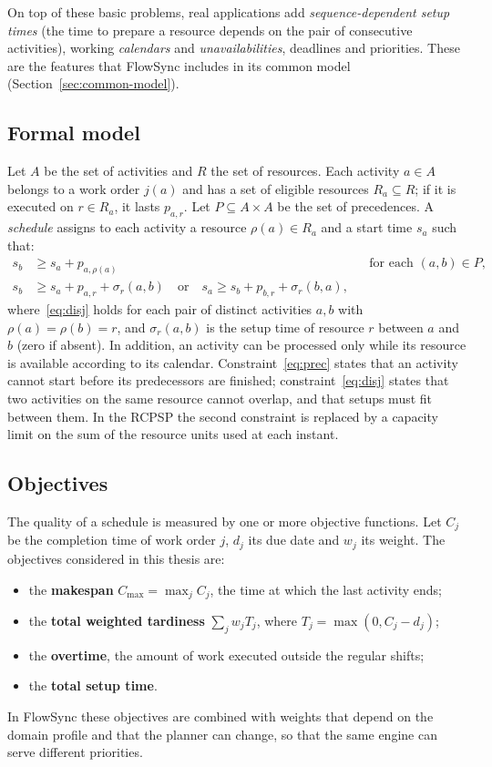 On top of these basic problems, real applications add \emph{sequence-dependent setup times} (the
time to prepare a resource depends on the pair of consecutive activities), working
\emph{calendars} and \emph{unavailabilities}, deadlines and priorities. These are the features
that FlowSync includes in its common model (Section~\ref{sec:common-model}).

\subsection{Formal model}

Let $A$ be the set of activities and $R$ the set of resources. Each activity $a \in A$ belongs to
a work order $j(a)$ and has a set of eligible resources $R_a \subseteq R$; if it is executed on
$r \in R_a$, it lasts $p_{a,r}$. Let $P \subseteq A \times A$ be the set of precedences. A
\emph{schedule} assigns to each activity a resource $\rho(a) \in R_a$ and a start time $s_a$ such
that:
\begin{align}
  s_b &\ge s_a + p_{a,\rho(a)} && \text{for each } (a,b) \in P, \label{eq:prec}\\
  s_b &\ge s_a + p_{a,r} + \sigma_r(a,b) \quad\text{or}\quad
  s_a \ge s_b + p_{b,r} + \sigma_r(b,a), \label{eq:disj}
\end{align}
where~\eqref{eq:disj} holds for each pair of distinct activities $a, b$ with $\rho(a) = \rho(b) = r$,
and $\sigma_r(a,b)$ is the setup time of resource $r$ between $a$ and $b$ (zero if absent).
In addition, an activity can be processed only while its resource is available according to its
calendar. Constraint~\eqref{eq:prec} states that an activity cannot start before its
predecessors are finished; constraint~\eqref{eq:disj} states that two activities on the same
resource cannot overlap, and that setups must fit between them. In the RCPSP the second
constraint is replaced by a capacity limit on the sum of the resource units used at each instant.

\subsection{Objectives}

The quality of a schedule is measured by one or more objective functions. Let $C_j$ be the
completion time of work order $j$, $d_j$ its due date and $w_j$ its weight. The objectives
considered in this thesis are:
\begin{itemize}
  \item the \textbf{makespan} $C_{\max} = \max_j C_j$, the time at which the last activity ends;
  \item the \textbf{total weighted tardiness} $\sum_j w_j T_j$, where $T_j = \max(0, C_j - d_j)$;
  \item the \textbf{overtime}, the amount of work executed outside the regular shifts;
  \item the \textbf{total setup time}.
\end{itemize}
In FlowSync these objectives are combined with weights that depend on the domain profile and that
the planner can change, so that the same engine can serve different priorities.

